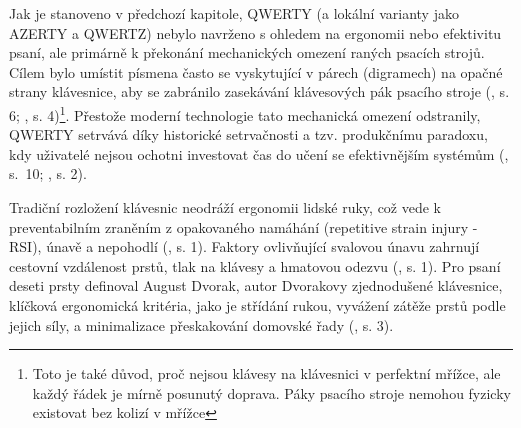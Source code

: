 \documentclass[a4paper, twoside, 12pt, czech]{article}
\begin{document}


Jak je stanoveno v předchozí kapitole, QWERTY (a lokální varianty jako AZERTY a QWERTZ) nebylo navrženo s ohledem 
na ergonomii nebo efektivitu psaní, ale primárně k překonání mechanických omezení
raných psacích strojů. Cílem bylo umístit písmena často se vyskytující v párech
(digramech) na opačné strany klávesnice, aby se zabránilo zasekávání klávesových 
pák psacího stroje (\cite{textEntrySystems}, s. 6; \cite{engramapproach}, s. 4)\footnote{
Toto je také důvod, proč nejsou klávesy na klávesnici v perfektní mřížce, ale každý 
řádek je mírně posunutý doprava. Páky psacího stroje nemohou fyzicky existovat bez 
kolizí v mřížce
}.
Přestože moderní technologie tato mechanická omezení odstranily, QWERTY setrvává 
díky historické setrvačnosti a tzv. produkčnímu paradoxu, kdy uživatelé nejsou 
ochotni investovat čas do učení se efektivnějším systémům (\cite{textEntrySystems}, s.~10; \cite{engramapproach}, s. 2).

Tradiční rozložení klávesnic neodráží ergonomii lidské ruky, což vede k preventabilním 
zraněním z opakovaného namáhání (repetitive strain injury - RSI), únavě a nepohodlí
(\cite{engramapproach}, s. 1). Faktory ovlivňující svalovou únavu zahrnují cestovní 
vzdálenost prstů, tlak na klávesy a hmatovou odezvu (\cite{applicationAlgo}, s. 1).
Pro psaní deseti prsty definoval August Dvorak, autor Dvorakovy zjednodušené klávesnice,
klíčková ergonomická kritéria, jako je střídání rukou, vyvážení zátěže prstů podle 
jejich síly, a minimalizace přeskakování domovské řady (\cite{engramapproach}, s. 3).
\end{document}
